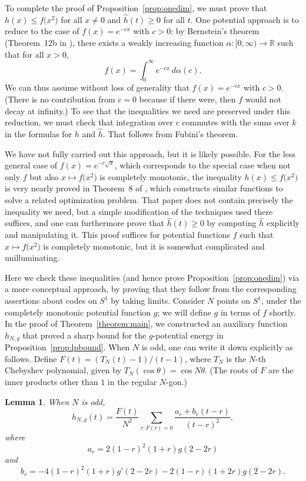 \documentclass{jams-l}
\theoremstyle{plain}
\newtheorem{lemma}[theorem]{Lemma}
\numberwithin{theorem}{section}
\theoremstyle{definition}
\numberwithin{equation}{section}
\newcommand{\R}{{\mathbb R}}
\newcommand{\co}{\colon}
\begin{document}
To complete the proof of Proposition~\ref{prop:onedim}, we must
prove that $h(x) \le f\big(x^2\big)$ for all $x \ne 0$ and
$\widehat{h}(t) \ge 0$ for all $t$.  One potential approach is to
reduce to the case of $f(x) = e^{-cx}$ with $c>0$: by Bernstein's
theorem (Theorem~12b in \cite[p.~161]{W}), there exists a weakly
increasing function $\alpha \co [0,\infty) \to \R$ such that for
all $x>0$,
$$
f(x) = \int_0^\infty e^{-cx} \, d\alpha(c).
$$
We can thus assume without loss of generality that $f(x) =
e^{-cx}$ with $c>0$.  (There is no contribution from $c=0$ because
if there were, then $f$ would not decay at infinity.) To see that
the inequalities we need are preserved under this reduction, we
must check that integration over $c$ commutes with the sums over
$k$ in the formulas for $h$ and $\widehat{h}$.  That follows from
Fubini's theorem.

We have not fully carried out this approach, but it is likely
possible.  For the less general case of $f(x) = e^{-c\sqrt{x}}$,
which corresponds to the special case when not only $f$ but also
$x \mapsto f\big(x^2\big)$ is completely monotonic, the inequality
$h(x) \le f\big(x^2\big)$ is very nearly proved in Theorem~8 of
\cite{GV}, which constructs similar functions to solve a related
optimization problem.  That paper does not contain precisely the
inequality we need, but a simple modification of the techniques
used there suffices, and one can furthermore prove that
$\widehat{h}(t) \ge 0$ by computing $\widehat{h}$ explicitly and
manipulating it. This proof suffices for potential functions $f$
such that $x \mapsto f\big(x^2\big)$ is completely monotonic, but
it is somewhat complicated and unilluminating.

Here we check these inequalities (and hence prove
Proposition~\ref{prop:onedim}) via a more conceptual approach, by
proving that they follow from the corresponding assertions about
codes on $S^1$ by taking limits.  Consider $N$ points on $S^1$,
under the completely monotonic potential function $g$;  we will
define $g$ in terms of $f$ shortly. In the proof of
Theorem~\ref{theorem:main}, we constructed an auxiliary function
$h_{N,g}$ that proved a sharp bound for the $g$-potential energy
in Proposition~\ref{prop:lpbound}.  When $N$ is odd, one can write
it down explicitly as follows.  Define $F(t) = (T_N(t)-1)/(t-1)$,
where $T_N$ is the $N$-th Chebyshev polynomial, given by $T_N(\cos
\theta) = \cos N\theta$.  (The roots of $F$ are the inner products
other than $1$ in the regular $N$-gon.)

\begin{lemma} \label{lemma:hformula}
When $N$ is odd,
$$
h_{N,g}(t) = \frac{F(t)}{N^2} \sum_{r : F(r)=0} \frac{a_r +
b_r(t-r)}{(t-r)^2},
$$
where
$$
a_r = 2(1-r)^2(1+r)g(2-2r)
$$
and
$$
b_r = -4(1-r)^2(1+r)g'(2-2r) - 2(1-r)(1+2r)g(2-2r).
$$
\end{lemma}
\end{document}
